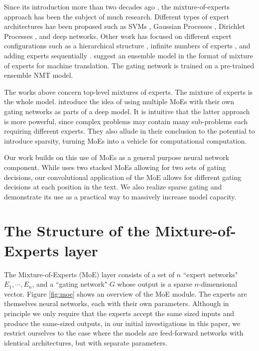 \documentclass{article} %
\begin{document}
Since its introduction more than two decades ago \citep{Jacobs91Adaptive,Jordan1994HME}, the mixture-of-experts approach has been the subject of much research.  Different types of expert architectures hae been proposed such as SVMs \citep{Collobert02PMS}, Gaussian Processes \citep{Tresp2001Mixture,Theis2015Generative,Deisenroth15Distributed}, Dirichlet Processes \citep{Shahbaba09NMU}, and deep networks.  Other work has focused on different expert configurations such as a hierarchical structure \citep{Yao09Hierarchical}, infinite numbers of experts \citep{Rasmussen02Infinite}, and adding experts sequentially \citep{Aljundi16}.  \cite{Garmash2016ensemble} suggest an ensemble model in the format of mixture of experts for machine translation. The gating network is trained on a pre-trained ensemble NMT model.

The works above concern top-level mixtures of experts.  The mixture of experts is the whole model.   \cite{eigen2013learning} introduce the idea of using multiple MoEs with their own gating networks as parts of a deep model.  It is intuitive that the latter approach is more powerful, since complex problems may contain many sub-problems each requiring different experts.  They also allude in their conclusion to the potential to introduce sparsity, turning MoEs into a vehicle for computational computation.  

Our work builds on this use of MoEs as a general purpose neural network component.  While \cite{eigen2013learning} uses two stacked MoEs allowing for two sets of gating decisions, our convolutional application of the MoE allows for different gating decisions at each position in the text.   We also realize sparse gating and demonstrate its use as a practical way to massively increase model capacity.

\section{The Structure of the Mixture-of-Experts layer}\label{sec:gating}

The Mixture-of-Experts (MoE) layer consists of a set of $n$ ``expert networks" $E_1, \cdots, E_n$, and a ``gating network" $G$ whose output is a sparse $n$-dimensional vector.  Figure \ref{fig:moe} shows an overview of the MoE module. The experts are themselves neural networks, each with their own parameters.  Although in principle we only require that the experts accept the same sized inputs and produce the same-sized outputs, in our initial investigations in this paper, we restrict ourselves to the case where the models are feed-forward networks with identical architectures, but with separate parameters.
\end{document}

